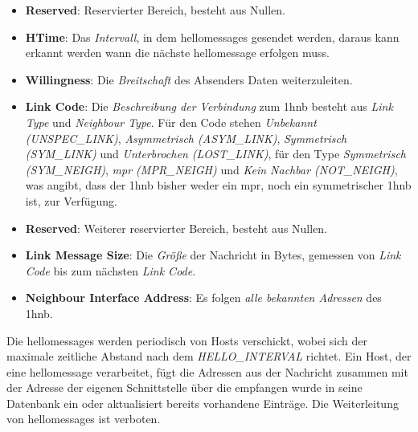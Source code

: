 \begin{itemize}
\item \textbf{Reserved}: Reservierter Bereich, besteht aus Nullen.
\item \textbf{HTime}: Das \textit{Intervall}, in dem \glspl{hellomessage} gesendet werden, daraus kann erkannt werden wann die nächste \gls{hellomessage} erfolgen muss.
\item \textbf{Willingness}: Die \textit{Breitschaft} des Absenders Daten weiterzuleiten.
\item \textbf{Link Code}: Die \textit{Beschreibung der Verbindung} zum \gls{1hnb} besteht aus \textit{Link Type} und \textit{Neighbour Type}. Für den Code stehen \textit{Unbekannt (UNSPEC\_LINK)}, \textit{Asymmetrisch (ASYM\_LINK)}, \textit{Symmetrisch (SYM\_LINK)} und \textit{Unterbrochen (LOST\_LINK)}, für den Type \textit{Symmetrisch (SYM\_NEIGH)}, \textit{\gls{mpr} (MPR\_NEIGH)} und \textit{Kein Nachbar (NOT\_NEIGH)}, was angibt, dass der \gls{1hnb} bisher weder ein \gls{mpr}, noch ein symmetrischer \gls{1hnb} ist, zur Verfügung.
\item \textbf{Reserved}: Weiterer reservierter Bereich, besteht aus Nullen.
\item \textbf{Link Message Size}: Die \textit{Größe} der Nachricht in Bytes, gemessen von \textit{Link Code} bis zum nächsten \textit{Link Code}.
\item \textbf{Neighbour Interface Address}: Es folgen \textit{alle bekannten Adressen} des \gls{1hnb}.
\end{itemize}

Die \glspl{hellomessage} werden periodisch von Hosts verschickt, wobei sich der maximale zeitliche Abstand nach dem \textit{HELLO\_INTERVAL} richtet. Ein Host, der eine \gls{hellomessage} verarbeitet, fügt die Adressen aus der Nachricht zusammen mit der Adresse der eigenen Schnittstelle über die empfangen wurde in seine Datenbank ein oder aktualisiert bereits vorhandene Einträge. Die Weiterleitung von \glspl{hellomessage} ist verboten.


